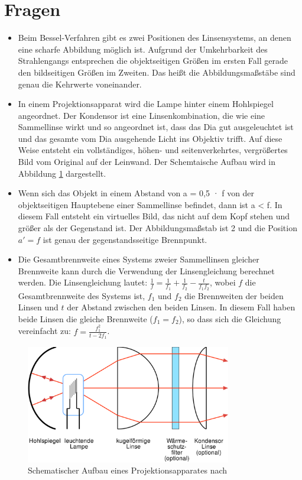 \documentclass[11pt, a4paper]{article}
\begin{document}
    \section{Fragen}
    \begin{itemize}
        \item Beim Bessel-Verfahren gibt es zwei Positionen des Linsensystems, an denen eine scharfe Abbildung möglich ist. Aufgrund der Umkehrbarkeit des Strahlengangs entsprechen die objektseitigen Größen im ersten Fall gerade den bildseitigen Größen im Zweiten. Das heißt die Abbildungsmaßstäbe sind genau die Kehrwerte voneinander.
        \item In einem Projektionsapparat wird die Lampe hinter einem Hohlspiegel angeordnet. Der Kondensor ist eine Linsenkombination, die wie eine Sammellinse wirkt und so angeordnet ist, dass das Dia gut ausgeleuchtet ist und das gesamte vom Dia ausgehende Licht ins Objektiv trifft. Auf diese Weise entsteht ein vollständiges, höhen- und seitenverkehrtes, vergrößertes Bild vom Original auf der Leinwand. Der Schemtaische Aufbau wird in Abbildung \ref{fig:projektionsapparat} dargestellt.
        \item Wenn sich das Objekt in einem Abstand von a = 0,5 · f von der objektseitigen Hauptebene einer Sammellinse befindet, dann ist a < f. In diesem Fall entsteht ein virtuelles Bild, das nicht auf dem Kopf stehen und größer als der Gegenstand ist. Der Abbildungsmaßstab ist 2 und die Position $a'= f$ ist genau der gegenstandsseitige Brennpunkt.
        \item Die Gesamtbrennweite eines Systems zweier Sammellinsen gleicher Brennweite kann durch die Verwendung der Linsengleichung berechnet werden. Die Linsengleichung lautet: $\frac{1}{f} = \frac{1}{f_1} + \frac{1}{f_2} - \frac{t}{f_1 f_2}$, wobei $f$ die Gesamtbrennweite des Systems ist, $f_1$ und $f_2$ die Brennweiten der beiden Linsen und $t$ der Abstand zwischen den beiden Linsen.
        In diesem Fall haben beide Linsen die gleiche Brennweite ($f_1 = f_2$), so dass sich die Gleichung vereinfacht zu: $f = \frac{f_1^2}{t-2f_1}$. 
    \end{itemize}

    \begin{figure}[h]
        \centering
        \includegraphics[width=0.8\textwidth]{Condensor-1-de.svg.png}
        \caption{Schematischer Aufbau eines Projektionsapparates nach \cite{projektionsapparat}}
        \label{fig:projektionsapparat}
    \end{figure}





    
    
\end{document}
